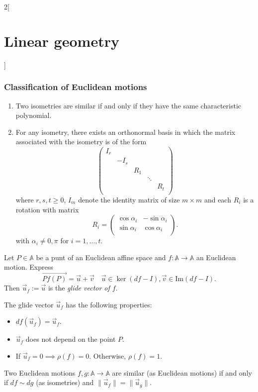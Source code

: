 \documentclass[class=article,10pt,crop=false]{standalone}
\begin{document}
\begin{multicols}{2}[\section{Linear geometry}]
\subsubsection{Classification of Euclidean motions}
\begin{theorem}
\hfill
\begin{enumerate}
    \item Two isometries are similar if and only if they have the same characteristic polynomial.
    \item For any isometry, there exists an orthonormal basis in which the matrix associated with the isometry is of the form  $$\begin{pmatrix}
    I_r &&&&\\
    & -I_s &&&\\
    && R_1 &&\\
    &&& \ddots &\\
    &&&& R_t\\
    \end{pmatrix}$$ where $r,s,t\geq 0$, $I_m$ denote the identity matrix of size $m\times m$ and each $R_i$ is a rotation with matrix $$R_i=\begin{pmatrix}
    \cos\alpha_i & -\sin\alpha_i\\
    \sin\alpha_i & \cos\alpha_i\\
    \end{pmatrix}.$$ with $\alpha_i\ne0,\pi$ for $i=1,\ldots,t$.
\end{enumerate}
\end{theorem}
\begin{definition}
Let $P\in\mathbb{A}$ be a punt of an Euclidean affine space and $f:\mathbb{A}\rightarrow\mathbb{A}$ an Euclidean motion. Express $$\overrightarrow{Pf(P)}=\overrightarrow{u}+\overrightarrow{v}\quad\overrightarrow{u}\in\ker(df-I),\overrightarrow{v}\in\text{Im}(df-I).$$ Then $\overrightarrow{u}_f:=\overrightarrow{u}$ is the \textit{glide vector of $f$}.
\end{definition}
\begin{prop}
The glide vector $\overrightarrow{u}_f$ has the following properties:
\begin{itemize}
    \item $df(\overrightarrow{u}_f)=\overrightarrow{u}_f$.
    \item $\overrightarrow{u}_f$ does not depend on the point $P$.
    \item If $\overrightarrow{u}_f=0\implies\rho(f)=0$. Otherwise, $\rho(f)=1$.
\end{itemize}
\end{prop}
\begin{theorem}
Two Euclidean motions $f,g:\mathbb{A}\rightarrow\mathbb{A}$ are similar (as Euclidean motions) if and only if $df\sim dg$ (as isometries) and $\|\overrightarrow{u}_f\|=\|\overrightarrow{u}_g\|$.
\end{theorem}

\end{multicols}
\end{document}
